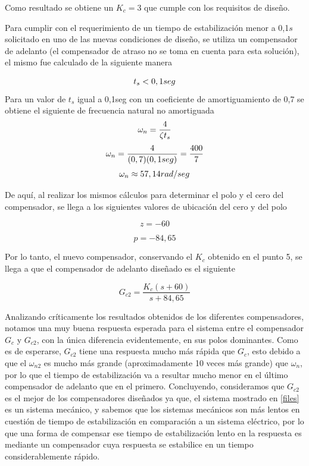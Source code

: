 \documentclass[12pt,letterpaper]{article}
\begin{document}
Como resultado se obtiene un $K_{c}=3$ que cumple con los requisitos de diseño.

Para cumplir con el requerimiento de un tiempo de estabilización menor a 0,1$s$ solicitado en uno de las nuevas condiciones de diseño, se utiliza un compensador de adelanto (el compensador de atraso no se toma en cuenta para esta solución), el mismo fue calculado de la siguiente manera

$$
    {t_{s}<0,1seg}\\
$$
Para un valor de $t_{s}$ igual a 0,1seg con un coeficiente de amortiguamiento de 0,7 se obtiene el siguiente de frecuencia natural no amortiguada
$$
    \omega_{n}=\frac{4}{\zeta t_{s}}\\
$$
$$
    \omega_{n}=\frac{4}{(0,7)(0,1seg)}=\frac{400}{7}\\
$$
\begin{equation}
\\
    \omega_{n}\approx 57,14rad/seg
    \label{FrecNueva}
\end{equation}

De aquí, al realizar los mismos cálculos para determinar el polo y el cero del compensador, se llega a los siguientes valores de ubicación del cero y del polo

\begin{equation}
    z = -60
    \label{zerNuevo}
\end{equation}

\begin{equation}
    p = -84,65
    \label{polNuevo}
\end{equation}

Por lo tanto, el nuevo compensador, conservando el $K_{c}$ obtenido en el punto 5, se llega a que el compensador de adelanto diseñado es el siguiente

\begin{equation}
    G_{c2}=\frac{K_{c}(s+60)}{s+84,65}
    \label{CompNuevo}
\end{equation}

Analizando críticamente los resultados obtenidos de los diferentes compensadores, notamos una muy buena respuesta esperada para el sistema entre el compensador $G_{c}$ y $G_{c2}$, con la única diferencia evidentemente, en sus polos dominantes. Como es de esperarse, $G_{c2}$ tiene una respuesta mucho más rápida que $G_{c}$, esto debido a que el $\omega_{n2}$ es mucho más grande (aproximadamente 10 veces más grande) que $\omega_{n}$, por lo que el tiempo de estabilización va a resultar mucho menor en el último compensador de adelanto que en el primero. Concluyendo, consideramos que $G_{c2}$ es el mejor de los compensadores diseñados ya que, el sistema mostrado en \ref{files} es un sistema mecánico, y sabemos que los sistemas mecánicos son más lentos en cuestión de tiempo de estabilización en comparación a un sistema eléctrico, por lo que una forma de compensar ese tiempo de estabilización lento en la respuesta es mediante un compensador cuya respuesta se estabilice en un tiempo considerablemente rápido.
\end{document}
